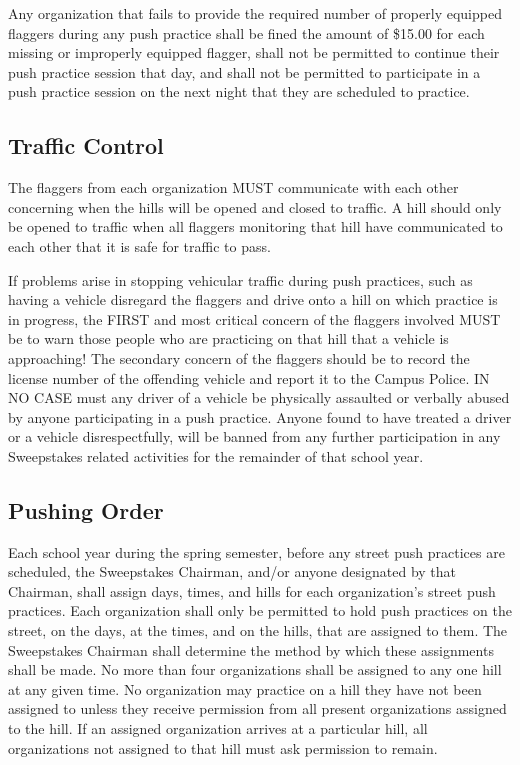 	Any organization that fails to provide the required number of properly equipped
	flaggers during any push practice shall be fined the amount of \$15.00 for each
	missing or improperly equipped flagger, shall not be permitted to continue
	their push practice session that day, and shall not be permitted to participate
	in a push practice session on the next night that they are scheduled to
	practice.

\subsection{Traffic Control}

	The flaggers from each organization MUST communicate with each other concerning
	when the hills will be opened and closed to traffic. A hill should only be
	opened to traffic when all flaggers monitoring that hill have communicated to
	each other that it is safe for traffic to pass.

	If problems arise in stopping vehicular traffic during push practices, such as
	having a vehicle disregard the flaggers and drive onto a hill on which practice
	is in progress, the FIRST and most critical concern of the flaggers involved
	MUST be to warn those people who are practicing on that hill that a vehicle is
	approaching! The secondary concern of the flaggers should be to record the
	license number of the offending vehicle and report it to the Campus Police. IN
	NO CASE must any driver of a vehicle be physically assaulted or verbally abused
	by anyone participating in a push practice. Anyone found to have treated a
	driver or a vehicle disrespectfully, will be banned from any further
	participation in any Sweepstakes related activities for the remainder of that
	school year.

\subsection{Pushing Order}

	Each school year during the spring semester, before any street push practices
	are scheduled, the Sweepstakes Chairman, and/or anyone designated by that
	Chairman, shall assign days, times, and hills for each organization's street
	push practices. Each organization shall only be permitted to hold push
	practices on the street, on the days, at the times, and on the hills, that are
	assigned to them. The Sweepstakes Chairman shall determine the method by which
	these assignments shall be made. No more than four organizations shall be
	assigned to any one hill at any given time. No organization may practice on a
	hill they have not been assigned to unless they receive permission from all
	present organizations assigned to the hill. If an assigned organization
	arrives at a particular hill, all organizations not assigned to that hill 
	must ask permission to remain.

